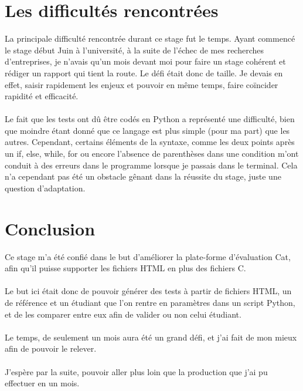 \documentclass[12pt,twoside]{book}
\begin{document}
\chapter{ Les difficultés rencontrées}
\color{black}
La principale difficulté rencontrée durant ce stage fut le temps. Ayant commencé le stage début Juin à l'université, à la suite de l'échec de mes recherches d'entreprises, je n'avais qu'un mois devant moi pour faire un stage cohérent et rédiger un rapport qui tient la route. Le défi était donc de taille. Je devais en effet, saisir rapidement les enjeux et pouvoir en même temps, faire coïncider rapidité et efficacité.\\ \\
Le fait que les tests ont dû être codés en Python a représenté une difficulté, bien que moindre étant donné que ce langage est plus simple (pour ma part) que les autres. Cependant, certains éléments de la syntaxe, comme les deux points après un if, else, while, for ou encore l'absence de parenthèses dans une condition m'ont conduit à des erreurs dans le programme lorsque je passais dans le terminal. Cela n'a cependant pas été un obstacle gênant dans la réussite du stage, juste une question d'adaptation.

\color{red}
\chapter{Conclusion}
\color{black}
Ce stage m'a été confié dans le but d'améliorer la plate-forme d'évaluation Cat, afin qu'il puisse supporter les fichiers HTML en plus des fichiers C.\\ \\
Le but ici était donc de pouvoir générer des tests à partir de fichiers HTML, un de référence et un étudiant que l'on rentre en paramètres dans un script Python, et de les comparer entre eux afin de valider ou non celui étudiant.\\ \\
Le temps, de seulement un mois aura été un grand défi, et j'ai fait de mon mieux afin de pouvoir le relever.\\ \\
J'espère par la suite, pouvoir aller plus loin que la production que j'ai pu effectuer en un mois.
\end{document}
